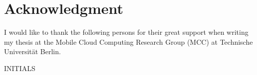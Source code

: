 
\cleardoublepage
{}
\section*{Acknowledgment}

I would like to thank the following persons for their great support when writing my thesis at the Mobile Cloud Computing Research Group (MCC) at Technische Universität Berlin.

\begin{flushright}
INITIALS\\[1pc]
\end{flushright}
